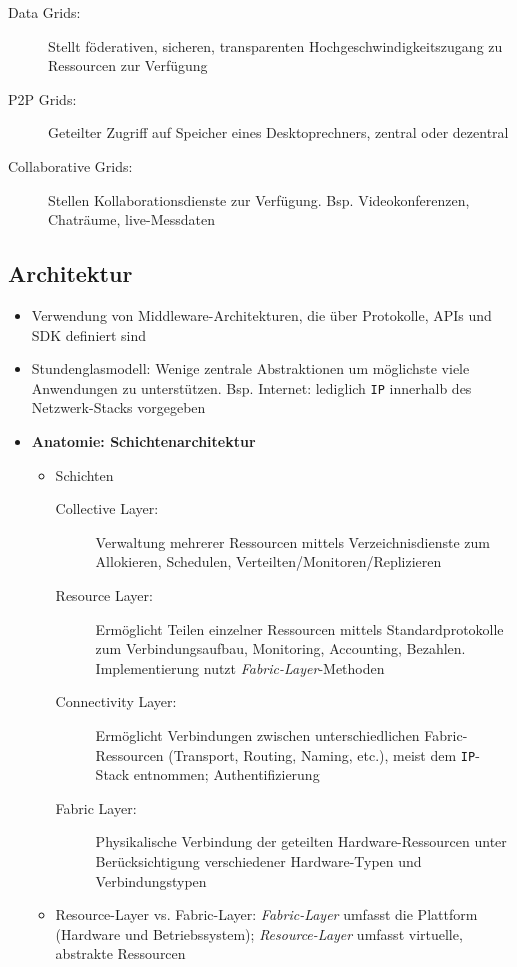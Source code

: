 \begin{itemize}
\begin{description}
		\item[Data Grids:] Stellt föderativen, sicheren, transparenten Hochgeschwindigkeitszugang zu Ressourcen zur Verfügung 
		\item[P2P Grids:] Geteilter Zugriff auf Speicher eines Desktoprechners, zentral oder dezentral
		\item[Collaborative Grids:] Stellen Kollaborationsdienste zur Verfügung. Bsp. Videokonferenzen, Chaträume, live-Messdaten
	\end{description}
\end{itemize}


\subsection{Architektur}
\begin{itemize}
	\item Verwendung von Middleware-Architekturen, die über Protokolle, APIs und SDK definiert sind
	\item Stundenglasmodell: Wenige zentrale Abstraktionen um möglichste viele Anwendungen zu unterstützen. Bsp. Internet: lediglich \texttt{IP} innerhalb des Netzwerk-Stacks vorgegeben
	\item \textbf{Anatomie: Schichtenarchitektur}
	\begin{itemize}
		\item Schichten
		\begin{description}
			\item[Collective Layer:] Verwaltung mehrerer Ressourcen mittels Verzeichnisdienste zum Allokieren, Schedulen, Verteilten/Monitoren/Replizieren
			\item[Resource Layer:] Ermöglicht Teilen einzelner Ressourcen mittels Standardprotokolle zum Verbindungsaufbau, Monitoring, Accounting, Bezahlen. Implementierung nutzt \textit{Fabric-Layer}-Methoden
			\item[Connectivity Layer:] Ermöglicht Verbindungen zwischen unterschiedlichen Fabric-Ressourcen (Transport, Routing, Naming, etc.), meist dem \texttt{IP}-Stack entnommen; Authentifizierung
			\item[Fabric Layer:] Physikalische Verbindung der geteilten Hardware-Ressourcen unter Berücksichtigung verschiedener Hardware-Typen und Verbindungstypen
		\end{description}
		\item Resource-Layer vs. Fabric-Layer: \textit{Fabric-Layer} umfasst die Plattform (Hardware und Betriebssystem); \textit{Resource-Layer} umfasst virtuelle, abstrakte Ressourcen

\end{itemize}
\end{itemize}
